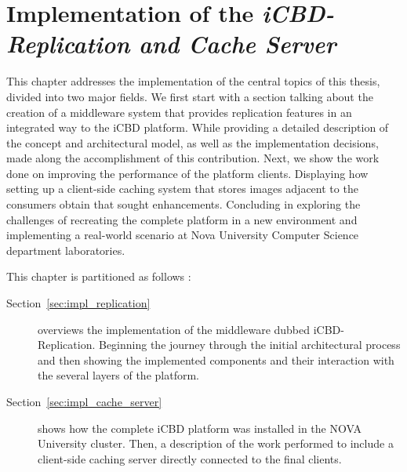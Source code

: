 \chapter{Implementation of the \textit{iCBD-Replication and Cache Server}}
\label{cha:impl_replication_caching}

This chapter addresses the implementation of the central topics of this thesis, divided into two major fields.
We first start with a section talking about the creation of a middleware system that provides replication features in an integrated way to the iCBD platform. While providing a detailed description of the concept and architectural model, as well as the implementation decisions, made along the accomplishment of this contribution.
Next, we show the work done on improving the performance of the platform clients. Displaying how setting up a client-side caching system that stores images adjacent to the consumers obtain that sought enhancements. Concluding in exploring the challenges of recreating the complete platform in a new environment and implementing a real-world scenario at Nova University Computer Science department laboratories.


This chapter is partitioned as follows :

\begin{description}
    \item [Section~\ref{sec:impl_replication}] overviews the implementation of the middleware dubbed iCBD-Replication. Beginning the journey through the initial architectural process and then showing the implemented components and their interaction with the several layers of the platform.
    \item [Section~\ref{sec:impl_cache_server}] shows how the complete iCBD platform was installed in the NOVA University cluster. Then, a description of the work performed to include a client-side caching server directly connected to the final clients.
\end{description}
\newpage



